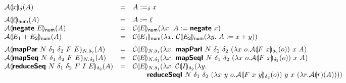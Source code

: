 \begin{figure}[H]
  \begin{minipage}{1.0\linewidth}
    \begin{displaymath}
      \begin{array}{lcl}
        \semA{x}_\delta(A)
        &=& A :=_\delta x \medskip\\
        \semA{\underline{\ell}}_{\num}(A)
        &=& A := \underline{\ell} \\
        \semA{\prim{negate}~E}_{\num}(A)
        &=& \semE{E}_{\num}(\lambda x.~A := \prim{negate}~x) \\
        \semA{E_1 + E_2}_{\num}(A)
        &=& \semE{E_1}_{\num}(\lambda x.~\semE{E_2}_{\num}(\lambda y.~A := x + y))\medskip\\

        \semA{\prim{mapPar}~N~\delta_1~\delta_2~F~E}_{N.\delta_2}(A)
        &=& \semE{E}_{N.\delta_1}(\lambda x.~\prim{mapParI}~N~\delta_1~\delta_2~(\lambda x~o. \semA{F~x}_{\delta_2}(o))~x~A) \\
        \semA{\prim{mapSeq}~N~\delta_1~\delta_2~F~E}_{N.\delta_2}(A)
        &=& \semE{E}_{N.\delta_1}(\lambda x.~\prim{mapSeqI}~N~\delta_1~\delta_2~(\lambda x~o. \semA{F~x}_{\delta_2}(o))~x~A) \\
        \semA{\prim{reduceSeq}~N~\delta_1~\delta_2~F~I~E}_{\delta_2}(A)
        &=& \begin{array}[t]{@{}l}
              \semE{E}_{N.\delta_1}(\lambda x.~\semE{I}_{\delta_2}(\lambda y.\\
              \quad\quad \prim{reduceSeqI}~N~\delta_1~\delta_2~(\lambda x~y~o. \semA{F~x~y}_{\delta_2}(o))~y~x~(\lambda r. \semA{r}(A))))
            \end{array} \medskip\\


\end{array}
\end{displaymath}
\end{minipage}
\end{figure}
